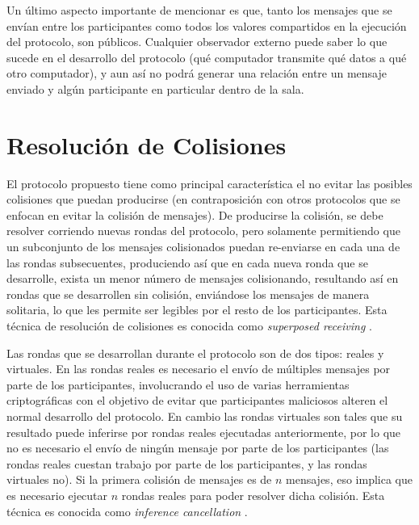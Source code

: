 Un último aspecto importante de mencionar es que, tanto los mensajes que se 
envían entre los 
participantes como todos los valores compartidos en la ejecución del 
protocolo, son públicos. Cualquier observador externo puede saber lo que 
sucede en el desarrollo del protocolo (qué computador transmite qué datos a 
qué otro computador), y aun así no podrá 
generar una relación entre un mensaje enviado y algún participante en 
particular dentro de la sala.

\section{Resolución de Colisiones}

El protocolo propuesto tiene como principal característica el no evitar las 
posibles colisiones que puedan producirse (en contraposición con otros 
protocolos que se enfocan en evitar la colisión de mensajes). De producirse la 
colisión, se debe resolver corriendo nuevas rondas del protocolo, pero 
solamente permitiendo que un subconjunto de los mensajes colisionados puedan 
re-enviarse en cada una de las rondas subsecuentes, produciendo así que en 
cada nueva ronda que se desarrolle, exista un menor número de mensajes 
colisionando, resultando así en rondas que se desarrollen sin colisión, 
enviándose los mensajes de manera solitaria, lo que les permite ser legibles 
por el resto de los participantes. Esta técnica de resolución de colisiones es 
conocida como \emph{superposed receiving} \cite{franck2014dining}.

Las rondas que se desarrollan durante el protocolo son de dos tipos: reales y 
virtuales. En las rondas reales es necesario el envío de múltiples mensajes 
por parte de los participantes, involucrando el uso de varias herramientas 
criptográficas con el objetivo de evitar que participantes maliciosos alteren 
el normal desarrollo del protocolo. En cambio las rondas virtuales son tales 
que su resultado puede inferirse por rondas reales ejecutadas anteriormente, 
por lo que no es necesario el envío de ningún mensaje por parte de los 
participantes (las rondas reales cuestan trabajo por parte de los 
participantes, y las rondas virtuales no). Si la primera colisión de mensajes 
es de $n$ mensajes, eso implica que es necesario ejecutar $n$ rondas reales 
para poder resolver dicha colisión. Esta técnica es conocida como 
\emph{inference cancellation} \cite{yu2005sicta}.

